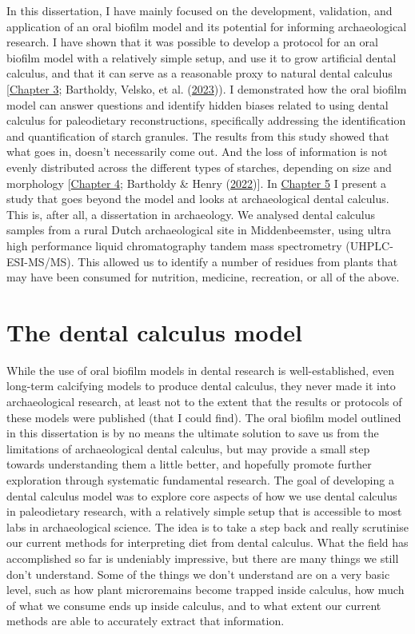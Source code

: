 \documentclass[
  letterpaper,
]{book}
\begin{document}
In this dissertation, I have mainly focused on the development,
validation, and application of an oral biofilm model and its potential
for informing archaeological research. I have shown that it was possible
to develop a protocol for an oral biofilm model with a relatively simple
setup, and use it to grow artificial dental calculus, and that it can
serve as a reasonable proxy to natural dental calculus
{[}\protect\hyperlink{byoc-valid}{Chapter 3}; Bartholdy, Velsko, et al.
(\protect\hyperlink{ref-bartholdyAssessingValidity2023}{2023})). I
demonstrated how the oral biofilm model can answer questions and
identify hidden biases related to using dental calculus for paleodietary
reconstructions, specifically addressing the identification and
quantification of starch granules. The results from this study showed
that what goes in, doesn't necessarily come out. And the loss of
information is not evenly distributed across the different types of
starches, depending on size and morphology
{[}\protect\hyperlink{byoc-starch}{Chapter 4}; Bartholdy \& Henry
(\protect\hyperlink{ref-bartholdyInvestigatingBiases2022}{2022}){]}. In
\protect\hyperlink{mb11CalculusPilot}{Chapter 5} I present a study that
goes beyond the model and looks at archaeological dental calculus. This
is, after all, a dissertation in archaeology. We analysed dental
calculus samples from a rural Dutch archaeological site in
Middenbeemster, using ultra high performance liquid chromatography
tandem mass spectrometry (UHPLC-ESI-MS/MS). This allowed us to identify
a number of residues from plants that may have been consumed for
nutrition, medicine, recreation, or all of the above.

\hypertarget{the-dental-calculus-model}{%
\section{The dental calculus model}\label{the-dental-calculus-model}}

While the use of oral biofilm models in dental research is
well-established, even long-term calcifying models to produce dental
calculus, they never made it into archaeological research, at least not
to the extent that the results or protocols of these models were
published (that I could find). The oral biofilm model outlined in this
dissertation is by no means the ultimate solution to save us from the
limitations of archaeological dental calculus, but may provide a small
step towards understanding them a little better, and hopefully promote
further exploration through systematic fundamental research. The goal of
developing a dental calculus model was to explore core aspects of how we
use dental calculus in paleodietary research, with a relatively simple
setup that is accessible to most labs in archaeological science. The
idea is to take a step back and really scrutinise our current methods
for interpreting diet from dental calculus. What the field has
accomplished so far is undeniably impressive, but there are many things
we still don't understand. Some of the things we don't understand are on
a very basic level, such as how plant microremains become trapped inside
calculus, how much of what we consume ends up inside calculus, and to
what extent our current methods are able to accurately extract that
information.
\end{document}
